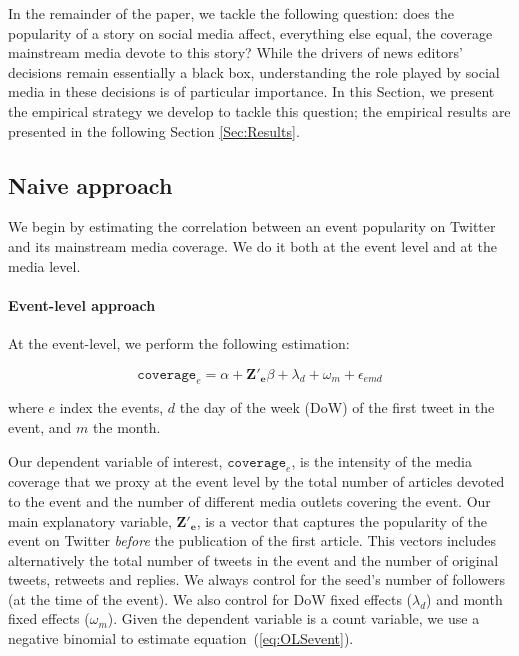 In the remainder of the paper, we tackle the following question: does the popularity of a story on social media affect, everything else equal, the coverage mainstream media devote to this story? While the drivers of news editors' decisions remain essentially a black box, understanding the role played by social media in these decisions is of particular importance. In this Section, we present the empirical strategy we develop to tackle this question; the empirical results are presented in the following Section \ref{Sec:Results}.


\subsection{Naive approach\label{Sec:SpecificationOLS}}

We begin by estimating the correlation between an event popularity on Twitter and its mainstream media coverage. We do it both at the event level and at the media level.


\paragraph{Event-level approach}

At the event-level, we perform the following estimation:

\begin{equation}
\mathtt{coverage}_{e}= \alpha + \mathbf{Z'_{e}}\beta + \lambda_d + \omega_m + \epsilon_{emd}
\label{eq:OLSevent}
\end{equation}

\noindent  where $e$ index the events, $d$ the day of the week (DoW) of the first tweet in the event, and $m$ the month.

Our dependent variable of interest, $\mathtt{coverage}_{e}$, is the intensity of the media coverage that we proxy at the event level by the total number of articles devoted to the event and the number of different media outlets covering the event. Our main explanatory variable, $\mathbf{Z'_{e}}$, is a  vector that captures the popularity of the event on Twitter \textit{before} the publication of the first article. This vectors includes alternatively the total number of tweets in the event and the number of original tweets, retweets and replies. We always control for the seed's number of followers (at the time of the event). We also control for DoW fixed effects ($\lambda_d$) and month fixed effects ($\omega_m$). Given the dependent variable is a count variable, we use a negative binomial to estimate equation~(\ref{eq:OLSevent}).


